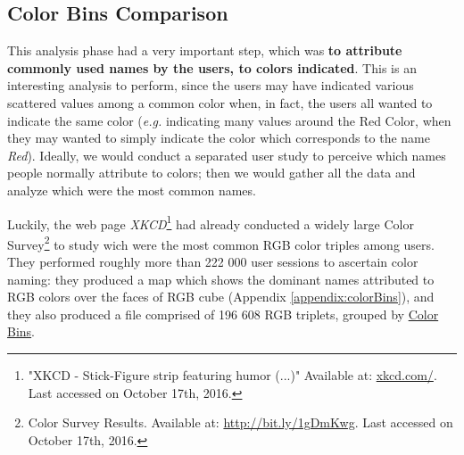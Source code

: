 \subsection{Color Bins Comparison}
\label{subsec:results_preparation}
%
This analysis phase had a very important step, which was \textbf{to attribute commonly used names by the users, to colors indicated}. This is an interesting
analysis to perform, since the users may have indicated various scattered values among a common color when, in fact, the users all wanted to indicate the same color (\emph{e.g.} indicating many values around the
Red Color, when they may wanted to simply indicate the color which corresponds to the name \emph{Red}). Ideally, we would conduct a separated user study to perceive which names people normally attribute to colors;
then we would gather all the data and analyze which were the most common names. \par
%
Luckily, the web page \emph{XKCD}\footnote{"XKCD - Stick-Figure strip featuring humor (...)" Available at: \url{xkcd.com/}. Last accessed on October 17th, 2016.} had already conducted a widely large Color Survey\footnote{Color Survey Results. Available at:
\url{http://bit.ly/1gDmKwg}. Last accessed on October 17th, 2016.} to study wich were the most common RGB color triples among users. They performed roughly more
than 222 000 user sessions to ascertain color naming: they produced a map which shows the dominant names attributed to \gls{RGB} colors over the faces of \gls{RGB} cube (Appendix \ref{appendix:colorBins}),
and they also produced a file comprised of 196 608 RGB triplets, grouped by \ul{Color Bins}. \par
%
